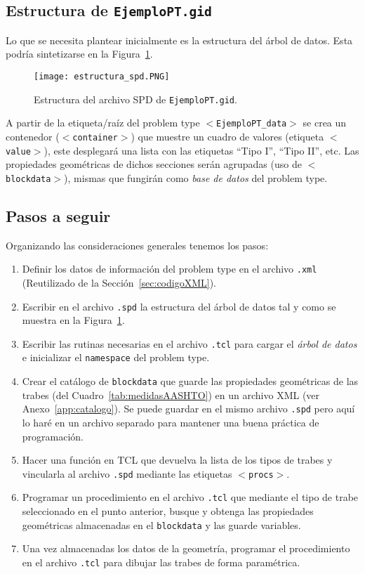 \documentclass[10pt, a4paper, twocolumn]{article}
\begin{document}
\subsection{Estructura de \texttt{EjemploPT.gid}}
Lo que se necesita plantear inicialmente es la estructura del árbol de datos. Esta podría sintetizarse en la Figura~\ref{fig:estructura_spd}.

\begin{figure}[hbtp!]
	\centering
	\texttt{[image: estructura\_spd.PNG]}
	\caption{Estructura del archivo SPD de \texttt{EjemploPT.gid}.\label{fig:estructura_spd}}
\end{figure}

A partir de la etiqueta/raíz del problem type \texttt{$<$EjemploPT\_data$>$} se crea un contenedor (\texttt{$<$container$>$}) que muestre un cuadro de valores (etiqueta \texttt{$<$value$>$}), este desplegará una lista con las etiquetas ``Tipo I'', ``Tipo II'', etc. Las propiedades geométricas de dichos secciones serán agrupadas (uso de \texttt{$<$blockdata$>$}), mismas que fungirán como \textit{base de datos} del problem type.

\subsection{Pasos a seguir}

Organizando las consideraciones generales tenemos los pasos:

\begin{enumerate}
	\item Definir los datos de información del problem type en el archivo \texttt{.xml} (Reutilizado de la Sección~\ref{sec:codigoXML}).
	\item Escribir en el archivo \texttt{.spd} la estructura del árbol de datos tal y como se muestra en la Figura~\ref{fig:estructura_spd}.
	\item Escribir las rutinas necesarias en el archivo \texttt{.tcl} para cargar el \textit{árbol de datos} e inicializar el \texttt{namespace} del problem type.
	\item Crear el catálogo de \texttt{blockdata} que guarde las propiedades geométricas de las trabes (del Cuadro~\ref{tab:medidasAASHTO}) en un archivo XML (ver Anexo~\ref{app:catalogo}). Se puede guardar en el mismo archivo \texttt{.spd} pero aquí lo haré en un archivo separado para mantener una buena práctica de programación.
	\item Hacer una función en TCL que devuelva la lista de los tipos de trabes y vincularla al archivo \texttt{.spd} mediante las etiquetas \texttt{$<$procs$>$}.
	\item Programar un procedimiento en el archivo \texttt{.tcl} que mediante el tipo de trabe seleccionado en el punto anterior, busque y obtenga las propiedades geométricas almacenadas en el \texttt{blockdata} y las guarde variables.
	\item Una vez almacenadas los datos de la geometría, programar el procedimiento en el archivo \texttt{.tcl} para dibujar las trabes de forma paramétrica.
\end{enumerate}
\end{document}
